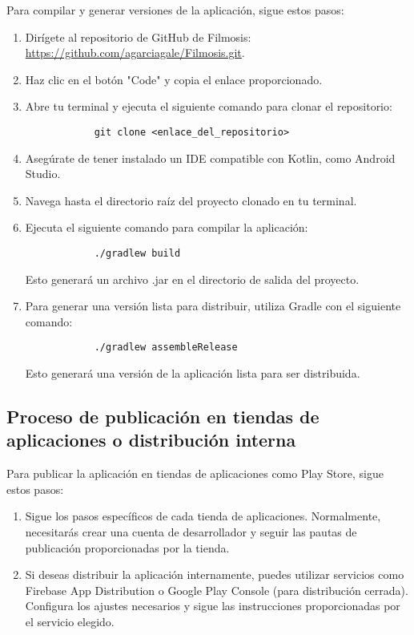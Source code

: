\documentclass{article}
\begin{document}
    Para compilar y generar versiones de la aplicación, sigue estos pasos:
    
    \begin{enumerate}
        \item Dirígete al repositorio de GitHub de Filmosis: \url{https://github.com/agarciagale/Filmosis.git}.
        
        \item Haz clic en el botón "Code" y copia el enlace proporcionado.
        
        \item Abre tu terminal y ejecuta el siguiente comando para clonar el repositorio:
        \begin{verbatim}
            git clone <enlace_del_repositorio>
        \end{verbatim}
        
        \item Asegúrate de tener instalado un IDE compatible con Kotlin, como Android Studio.
        
        \item Navega hasta el directorio raíz del proyecto clonado en tu terminal.
        
        \item Ejecuta el siguiente comando para compilar la aplicación:
        \begin{verbatim}
            ./gradlew build
        \end{verbatim}
        Esto generará un archivo .jar en el directorio de salida del proyecto.
        
        \item Para generar una versión lista para distribuir, utiliza Gradle con el siguiente comando:
        \begin{verbatim}
            ./gradlew assembleRelease
        \end{verbatim}
        Esto generará una versión de la aplicación lista para ser distribuida.
    \end{enumerate}
    
    \subsection{Proceso de publicación en tiendas de aplicaciones o distribución interna}
    
    Para publicar la aplicación en tiendas de aplicaciones como Play Store, sigue estos pasos:
    
    \begin{enumerate}
        \item Sigue los pasos específicos de cada tienda de aplicaciones. Normalmente, necesitarás crear una cuenta de desarrollador y seguir las pautas de publicación proporcionadas por la tienda.
        
        \item Si deseas distribuir la aplicación internamente, puedes utilizar servicios como Firebase App Distribution o Google Play Console (para distribución cerrada). Configura los ajustes necesarios y sigue las instrucciones proporcionadas por el servicio elegido.
    \end{enumerate}
\end{document}
